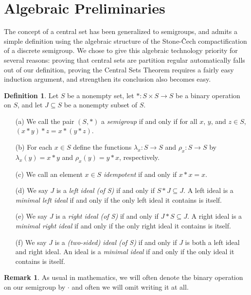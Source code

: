 \documentclass[12pt]{article}
\theoremstyle{plain}
\theoremstyle{definition}
\newtheorem{defn}[thm]{Definition}
\newtheorem{rmk}[thm]{Remark}
\begin{document}
\section{Algebraic Preliminaries}
The concept of a central set has been generalized to semigroups, and
admits a simple definition using the algebraic structure of the
Stone-\v{C}ech compactification of a discrete semigroup.
We chose to give this algebraic technology priority for several
reasons: proving that central sets are partition regular automatically
falls out of our definition, proving the Central Sets Theorem requires
a fairly easy induction argument, and strengthen its conclusion also
becomes easy. 
\begin{defn}
  Let $S$ be a nonempty set, let $* \colon S \times S \to S$ be
  a binary operation on $S$, and let $J \subseteq S$ be a nonempty
  subset of $S$.
  \begin{itemize}
    \item[(a)] We call the pair $(S, *)$ a \textsl{semigroup} if
      and only if for all $x$, $y$, and $z \in S$, $(x * y) *
      z = x * (y * z)$.
    \item[(b)] For each $x \in S$ define the functions $\lambda_x
      \colon S \to S$ and $\rho_x \colon S \to S$ by $\lambda_x(y) = x
      * y$ and $\rho_x(y) = y * x$, respectively.
    \item[(c)] We call an element $x \in S$ \textsl{idempotent} if and
      only if $x*x = x$. 
    \item[(d)] We say $J$ is a \textsl{left ideal (of S)} if and only
      if $S * J \subseteq J$.
      A left ideal is a \textsl{minimal left ideal} if and only if the
      only left ideal it contains is itself.
    \item[(e)] We say $J$ is a \textsl{right ideal (of S)} if and only
      if $J * S \subseteq J$.
      A right ideal is a \textsl{minimal right ideal} if and only if the
      only right ideal it contains is itself.
    \item[(f)] We say $J$ is a \textsl{(two-sided) ideal (of S)} if and only
      if $J$ is both a left ideal and right ideal.
      An ideal is a \textsl{minimal ideal} if and only if the only
      ideal it contains is itself.
  \end{itemize}
\end{defn}
\begin{rmk}
  As usual in mathematics, we will often denote the binary operation
  on our semigroup by $\cdot$ and often we will omit writing it at
  all.
\end{rmk}
\end{document}
